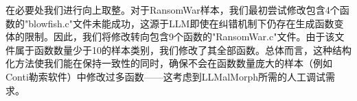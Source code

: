 在必要处我们进行向上取整。对于RansomWar样本，我们最初尝试修改包含4个函数的"blowfish.c"文件未能成功，这源于LLM即使在纠错机制下仍存在生成函数变体的限制。因此，我们将修改转向包含9个函数的"RansomWar.c"文件。由于该文件属于函数数量少于10的样本类别，我们修改了其全部函数。总体而言，这种结构化方法使我们能在保持一致性的同时，确保不会在函数数量庞大的样本（例如Conti勒索软件）中修改过多函数——这考虑到LLMalMorph所需的人工调试需求。